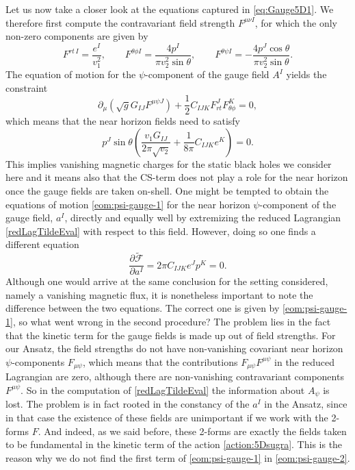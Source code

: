 \documentclass[12pt,twoside]{book}
\begin{document}
\begin{appendices}
Let us now take a closer look at the equations captured in \eqref{eq:Gauge5D1}. We therefore first compute the contravariant field strength $F^{\mu\nu I}$, for which the only non-zero components are given by
\begin{equation}
F^{rt\, I}=\frac{e^{I}}{v^{2}_{1}},  \qquad  F^{\theta\phi I} =\frac{4 p^{I}}{\pi v^2_{2}\sin\theta}, \qquad
F^{\theta\psi I} = - \frac{4 p^{J}\cos\theta}{\pi v_{2}^{2} \sin\theta}.
\end{equation}
The equation of motion for the $\psi$-component of the gauge field $A^{I}$ yields the constraint
\begin{equation}
\partial_{\mu} \left( \sqrt{g} G_{IJ} F^{\mu\psi J} \right) + \frac{1}{2}  C_{IJK}F^{J}_{rt}F^{K}_{\theta\phi}=0,
\end{equation}
which means that the near horizon fields need to satisfy
\begin{equation}\label{eom:psi-gauge-1}
p^{J} \sin\theta \left( \frac{v_{1} G_{IJ}}{2\pi \sqrt{v_{2}}} + \frac{1}{8 \pi}C_{IJK} e^{K} \right) = 0.
\end{equation}
This implies vanishing magnetic charges for the static black holes we consider here and it means also that the CS-term does not play a role for the near horizon once the gauge fields are taken on-shell. One might be tempted to obtain the equations of motion \eqref{eom:psi-gauge-1} for the near horizon $\psi$-component of the gauge field, $a^{I}$, directly and equally well by extremizing the reduced Lagrangian \eqref{redLagTildeEval} with respect to this field. However, doing so one finds a different equation
\begin{equation}\label{eom:psi-gauge-2}
\frac{\partial \tilde{\mathcal{F}}}{\partial a^{I}} = 2 \pi C_{IJK} e^{J} p^{K} = 0.
\end{equation} 
Although one would arrive at the same conclusion for the setting considered, namely a vanishing magnetic flux, it is nonetheless important to note the difference between the two equations. The correct one is given by \eqref{eom:psi-gauge-1}, so what went wrong in the second procedure? The problem lies in the fact that the kinetic term for the gauge fields is made up out of field strengths. For our Ansatz, the field strengths do not have non-vanishing covariant near horizon $\psi$-components $F_{\mu\psi}$, which means that the contributions $F_{\mu\psi}F^{\mu\psi}$ in the reduced Lagrangian are zero, although there are non-vanishing contravariant components $F^{\mu\psi}$. So in the computation of \eqref{redLagTildeEval} the information about $A_{\psi}$ is lost. The problem is in fact rooted in the constancy of the $a^{I}$ in the Ansatz, since in that case the existence of these fields are unimportant if we work with the 2-forms $F$. And indeed, as we said before, these 2-forms are exactly the fields taken to be fundamental in the kinetic term of the action \eqref{action:5Dsugra}. This is the reason why we do not find the first term of \eqref{eom:psi-gauge-1} in \eqref{eom:psi-gauge-2}.


\end{appendices}
\end{document}
